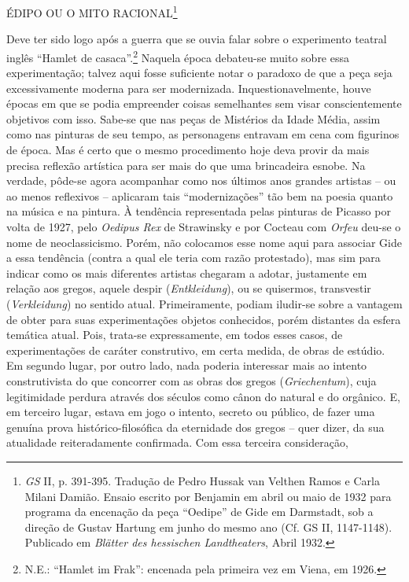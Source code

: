 ÉDIPO OU O MITO RACIONAL\footnote{\emph{GS} II, p. 391-395. Tradução de
  Pedro Hussak van Velthen Ramos e Carla Milani Damião. Ensaio escrito
  por Benjamin em abril ou maio de 1932 para programa da encenação da
  peça ``Oedipe'' de Gide em Darmstadt, sob a direção de Gustav Hartung
  em junho do mesmo ano (Cf. GS II, 1147-1148). Publicado em
  \emph{Blätter des hessischen Landtheaters}, Abril 1932.}

Deve ter sido logo após a guerra que se ouvia falar sobre o experimento
teatral inglês ``Hamlet de casaca''.\footnote{N.E.: ``Hamlet im Frak'':
  encenada pela primeira vez em Viena, em 1926.} Naquela época
debateu-se muito sobre essa experimentação; talvez aqui fosse suficiente
notar o paradoxo de que a peça seja excessivamente moderna para ser
modernizada. Inquestionavelmente, houve épocas em que se podia
empreender coisas semelhantes sem visar conscientemente objetivos com
isso. Sabe-se que nas peças de Mistérios da Idade Média, assim como nas
pinturas de seu tempo, as personagens entravam em cena com figurinos de
época. Mas é certo que o mesmo procedimento hoje deva provir da mais
precisa reflexão artística para ser mais do que uma brincadeira esnobe.
Na verdade, pôde-se agora acompanhar como nos últimos anos grandes
artistas -- ou ao menos reflexivos -- aplicaram tais ``modernizações''
tão bem na poesia quanto na música e na pintura. À tendência
representada pelas pinturas de Picasso por volta de 1927, pelo
\emph{Oedipus Rex} de Strawinsky e por Cocteau com \emph{Orfeu} deu-se o
nome de neoclassicismo. Porém, não colocamos esse nome aqui para
associar Gide a essa tendência (contra a qual ele teria com razão
protestado), mas sim para indicar como os mais diferentes artistas
chegaram a adotar, justamente em relação aos gregos, aquele despir
(\emph{Entkleidung}), ou se quisermos, transvestir (\emph{Verkleidung})
no sentido atual. Primeiramente, podiam iludir-se sobre a vantagem de
obter para suas experimentações objetos conhecidos, porém distantes da
esfera temática atual. Pois, trata-se expressamente, em todos esses
casos, de experimentações de caráter construtivo, em certa medida, de
obras de estúdio. Em segundo lugar, por outro lado, nada poderia
interessar mais ao intento construtivista do que concorrer com as obras
dos gregos (\emph{Griechentum}), cuja legitimidade perdura através dos
séculos como cânon do natural e do orgânico. E, em terceiro lugar,
estava em jogo o intento, secreto ou público, de fazer uma genuína prova
histórico-filosófica da eternidade dos gregos -- quer dizer, da sua
atualidade reiteradamente confirmada. Com essa terceira consideração,
